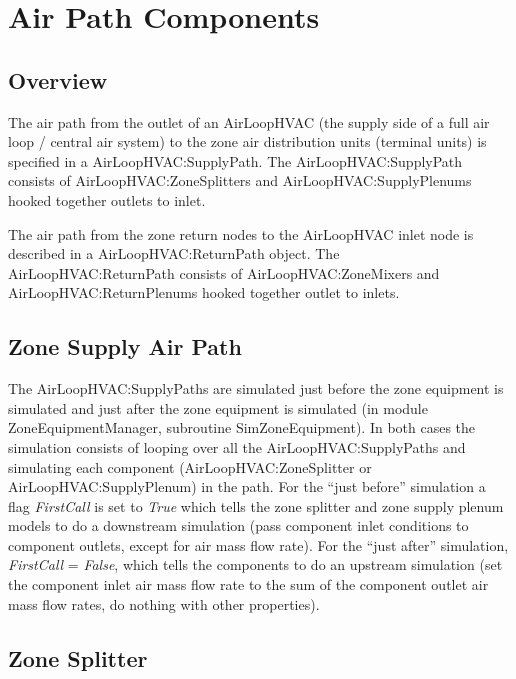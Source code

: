\section{Air Path Components}\label{air-path-components}

\subsection{Overview}\label{overview-201709281620}

The air path from the outlet of an AirLoopHVAC (the supply side of a full air loop / central air system) to the zone air distribution units (terminal units) is specified in a AirLoopHVAC:SupplyPath. The AirLoopHVAC:SupplyPath consists of AirLoopHVAC:ZoneSplitters and AirLoopHVAC:SupplyPlenums hooked together outlets to inlet.

The air path from the zone return nodes to the AirLoopHVAC inlet node is described in a AirLoopHVAC:ReturnPath object. The~ AirLoopHVAC:ReturnPath consists of AirLoopHVAC:ZoneMixers and AirLoopHVAC:ReturnPlenums hooked together outlet to inlets.

\subsection{Zone Supply Air Path}\label{zone-supply-air-path}

The AirLoopHVAC:SupplyPaths are simulated just before the zone equipment is simulated and just after the zone equipment is simulated (in module ZoneEquipmentManager, subroutine SimZoneEquipment). In both cases the simulation consists of looping over all the AirLoopHVAC:SupplyPaths and simulating each component (AirLoopHVAC:ZoneSplitter or AirLoopHVAC:SupplyPlenum) in the path. For the ``just before'' simulation a flag \emph{FirstCall} is set to \emph{True} which tells the zone splitter and zone supply plenum models to do a downstream simulation (pass component inlet conditions to component outlets, except for air mass flow rate). For the ``just after'' simulation, \emph{FirstCall} = \emph{False}, which tells the components to do an upstream simulation (set the component inlet air mass flow rate to the sum of the component outlet air mass flow rates, do nothing with other properties).

\subsection{Zone Splitter}\label{zone-splitter}

